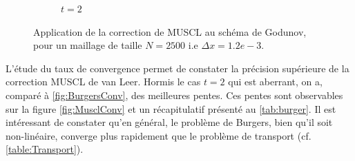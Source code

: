 \documentclass[
	french,
	11pt, %
]{fphw}
\begin{document}
\begin{figure}[H]
\begin{subfigure}{0.32\textwidth}
		\caption{$t=2$}
		\label{fig:MusclFaux3}
\end{subfigure}
	\caption{Application de la correction de MUSCL au schéma de Godunov, pour un maillage de taille $N=2500$ i.e $\Delta x = 1.2e-3$.}
	\label{fig:Muscl3}
\end{figure}


\noindent L'étude du taux de convergence permet de constater la précision supérieure de la correction MUSCL de van Leer. Hormis le cas $t=2$ qui est aberrant, on a, comparé à \cref{fig:BurgersConv}, des meilleures pentes. Ces pentes sont observables sur la figure \cref{fig:MusclConv} et un récapitulatif présenté au \cref{tab:burger}. Il est intéressant de constater qu'en général, le problème de Burgers, bien qu'il soit non-linéaire, converge plus rapidement que le problème de transport (cf. \cref{table:Transport}).
\end{document}
